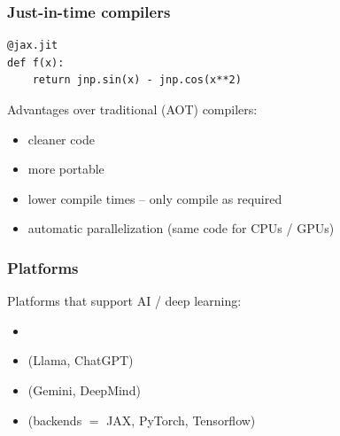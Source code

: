 \begin{frame}[fragile]
    \frametitle{Just-in-time compilers}

    \vspace{0.5em}
    
    \begin{verbatim}
@jax.jit
def f(x):
    return jnp.sin(x) - jnp.cos(x**2)
    \end{verbatim}

    \vspace{0.5em}
    \vspace{0.5em}
    Advantages over traditional (AOT) compilers:

    \begin{itemize}
        \item cleaner code 
    \vspace{0.5em}
        \item more portable
    \vspace{0.5em}
        \item lower compile times -- only compile as required
    \vspace{0.5em}
        \item automatic parallelization (same code for CPUs / GPUs)
    \end{itemize}

\end{frame}



\begin{frame}
    \frametitle{Platforms}
    
    Platforms that support AI / deep learning:

    \vspace{0.5em}
    \begin{itemize}
        \item {}
        \vspace{0.5em}
        \item {} (Llama, ChatGPT)
        \vspace{0.5em}
        \item {} (Gemini, DeepMind)
        \vspace{0.5em}
        \item {} (backends $=$ JAX, PyTorch, Tensorflow)
    \end{itemize}

\end{frame}


